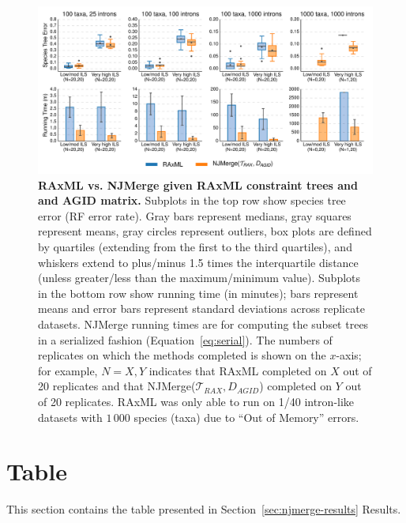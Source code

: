\begin{figure}[!h]
\centering
\includegraphics[width=\textwidth]{figures/njmerge-fig10.pdf}
\caption{
{\bf RAxML vs. NJMerge given RAxML constraint trees and and AGID matrix. }
Subplots in the top row show species tree error (RF error rate).
Gray bars represent medians, gray squares represent means, gray circles represent outliers, box plots are defined by quartiles (extending from the first to the third quartiles), and whiskers extend to plus/minus 1.5 times the interquartile distance (unless greater/less than the maximum/minimum value).
Subplots in the bottom row show running time (in minutes); bars represent means and error bars represent standard deviations across replicate datasets.
NJMerge running times are for computing the subset trees in a serialized fashion (Equation~\ref{eq:serial}).
The numbers of replicates on which the methods completed is shown on the $x$-axis; for example, $N=X,Y$ indicates that RAxML completed on $X$ out of 20 replicates and that NJMerge($\mathcal{T}_{RAX},D_{AGID}$) completed on $Y$ out of 20 replicates.
RAxML was only able to run on 1/40 intron-like datasets with $1\,000$ species (taxa) due to ``Out of Memory'' errors.
}
\label{fig:raxml-intron}
\end{figure}

\clearpage
\newpage

\section{Table}
\label{sec:njmerge-tables}
This section contains the table presented in Section~\ref{sec:njmerge-results} Results.

\vspace{12pt}

